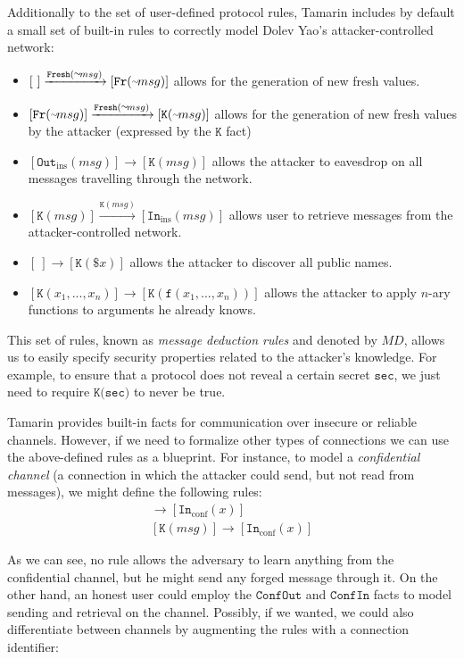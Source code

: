 Additionally to the set of user-defined protocol rules, Tamarin includes by default a small set of built-in rules to correctly model Dolev Yao's attacker-controlled network:

\begin{itemize}
    \item $[ \ ] \xrightarrow{\texttt{Fresh}(\fr msg)} [ \texttt{Fr}(\fr msg) ]$ allows for the generation of new fresh values.
    \item $[ \texttt{Fr}(\fr msg) ] \xrightarrow{\texttt{Fresh}(\fr msg)} [ \texttt{K}(\fr msg) ]$ allows for the generation of new fresh values by the attacker (expressed by the $\texttt{K}$ fact)
    \item $[ \texttt{Out}_{\textrm{ins}}(msg) ] \to [ \texttt{K}(msg) ]$ allows the attacker to eavesdrop on all messages travelling through the network. 
    \item $[ \texttt{K}(msg) ] \xrightarrow{\texttt{K}(msg)} [ \texttt{In}_{\textrm{ins}}(msg) ]$ allows user to retrieve messages from the attacker-controlled network.
    \item $[ \ ] \to [ \texttt{K}(\$x) ]$ allows the attacker to discover all public names.
    \item $[ \texttt{K}(x_1,...,x_n) ] \to [ \texttt{K}(\texttt{f}(x_1,...,x_n)) ]$ allows the attacker to apply $n$-ary functions to arguments he already knows.
\end{itemize}

This set of rules, known as \textit{message deduction rules} and denoted by $MD$, allows us to easily specify security properties related to the attacker's knowledge. For example, to ensure that a protocol does not reveal a certain secret $\texttt{sec}$, we just need to require $\texttt{K(sec)}$ to never be true.

Tamarin provides built-in facts for communication over insecure or reliable channels. However, if we need to formalize other types of connections we can use the above-defined rules as a blueprint. For instance, to model a \textit{confidential channel} (a connection in which the attacker could send, but not read from messages), we might define the following rules:
\begin{gather*}
    [ \texttt{Out}_{\textrm{conf}}(msg)] \to [ \texttt{In}_{\textrm{conf}}(x) ]\\
    [ \texttt{K}(msg) ] \to [ \texttt{In}_{\textrm{conf}}(x) ]
\end{gather*}

As we can see, no rule allows the adversary to learn anything from the confidential channel, but he might send any forged message through it. On the other hand, an honest user could employ the $\texttt{ConfOut}$ and $\texttt{ConfIn}$ facts to model sending and retrieval on the channel. Possibly, if we wanted, we could also differentiate between channels by augmenting the rules with a connection identifier:

